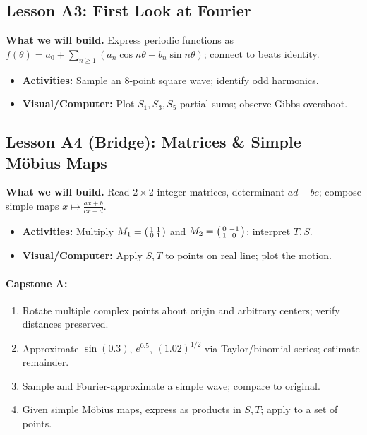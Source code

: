 \documentclass[11pt]{article}
\begin{document}
\subsection*{Lesson A3: First Look at Fourier}
\textbf{What we will build.} Express periodic functions as $\displaystyle f(\theta)=a_0+\sum_{n\ge1}(a_n\cos n\theta+b_n\sin n\theta)$; connect to beats identity.
\begin{itemize}
\item \textbf{Activities:} Sample an 8-point square wave; identify odd harmonics.
\item \textbf{Visual/Computer:} Plot $S_1,S_3,S_5$ partial sums; observe Gibbs overshoot.
\end{itemize}

\subsection*{Lesson A4 (Bridge): Matrices \& Simple Möbius Maps}
\textbf{What we will build.} Read $2\times 2$ integer matrices, determinant $ad-bc$; compose simple maps $x\mapsto\frac{ax+b}{cx+d}$.
\begin{itemize}
\item \textbf{Activities:} Multiply $M_1=\begin{psmallmatrix}1&1\\0&1\end{psmallmatrix}$ and $M_2=\begin{psmallmatrix}0&-1\\1&0\end{psmallmatrix}$; interpret $T,S$.
\item \textbf{Visual/Computer:} Apply $S,T$ to points on real line; plot the motion.
\end{itemize}

\paragraph{Capstone A:}
\begin{enumerate}
\item Rotate multiple complex points about origin and arbitrary centers; verify distances preserved.
\item Approximate $\sin(0.3)$, $e^{0.5}$, $(1.02)^{1/2}$ via Taylor/binomial series; estimate remainder.
\item Sample and Fourier-approximate a simple wave; compare to original.
\item Given simple Möbius maps, express as products in $S,T$; apply to a set of points.
\end{enumerate}
\end{document}

